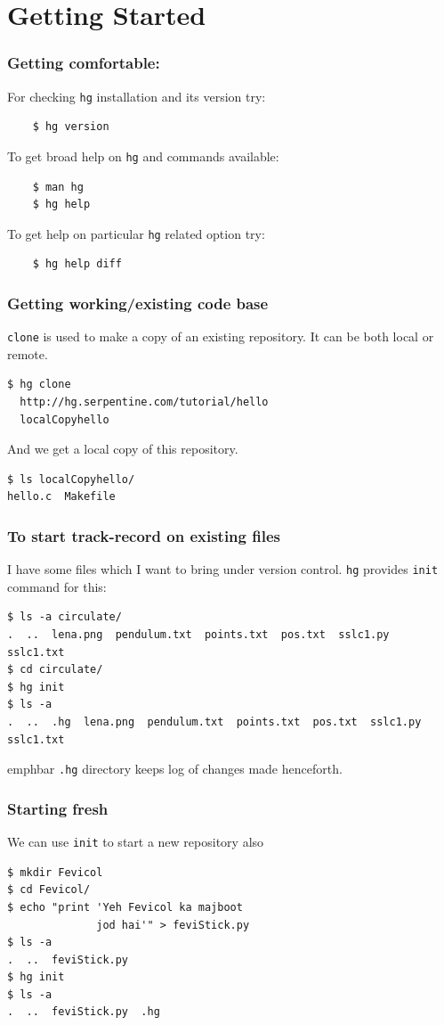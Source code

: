 \documentclass[14pt,compress]{beamer}
\newcommand{\emphbar}[1]
{\begin{beamercolorbox}[rounded=true]{emphbar} 
      {#1}
 \end{beamercolorbox}
}
\newcommand{\typ}[1]{\lstinline{#1}}
\begin{document}
\section{Getting Started}

\begin{frame}[fragile]
  \frametitle{Getting comfortable:}
  For checking \typ{hg} installation and its version try:
  \begin{lstlisting}
    $ hg version    
  \end{lstlisting}
  To get broad help on \typ{hg} and commands available:
  \begin{lstlisting}
    $ man hg
    $ hg help
  \end{lstlisting}
  To get help on particular \typ{hg} related option try:
  \begin{lstlisting}
    $ hg help diff
  \end{lstlisting} %
\end{frame}

\begin{frame}[fragile]
  \frametitle{Getting working/existing code base}
  \typ{clone} is used to make a copy of an existing repository. It can be both local or remote.
  \begin{lstlisting}
$ hg clone 
  http://hg.serpentine.com/tutorial/hello 
  localCopyhello
  \end{lstlisting}
  And we get a local copy of this repository. 
  \begin{lstlisting}
$ ls localCopyhello/
hello.c  Makefile
  \end{lstlisting}
\end{frame}

\begin{frame}[fragile]
  \frametitle{To start track-record on existing files}
  I have some files which I want to bring under version control. \typ{hg} provides \typ{init} command for this: 
  \begin{lstlisting}
$ ls -a circulate/
.  ..  lena.png  pendulum.txt  points.txt  pos.txt  sslc1.py  sslc1.txt
$ cd circulate/
$ hg init
$ ls -a
.  ..  .hg  lena.png  pendulum.txt  points.txt  pos.txt  sslc1.py  sslc1.txt    
  \end{lstlisting}
  \emphbar{\typ{.hg} directory keeps log of changes made henceforth.}
\end{frame}

\begin{frame}[fragile]
  \frametitle{Starting fresh}
  We can use \typ{init} to start a new repository also
  \begin{lstlisting}
$ mkdir Fevicol
$ cd Fevicol/
$ echo "print 'Yeh Fevicol ka majboot 
              jod hai'" > feviStick.py
$ ls -a
.  ..  feviStick.py
$ hg init
$ ls -a
.  ..  feviStick.py  .hg
  \end{lstlisting}
\end{frame}
\end{document}
